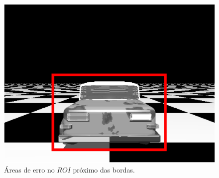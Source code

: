 \begin{figure}[H]
\includegraphics[width=\columnwidth]{images/imageError.eps}
\caption{Áreas de erro no $ROI$ próximo das bordas.}
\label{fig:erroridentified}
\end{figure}

